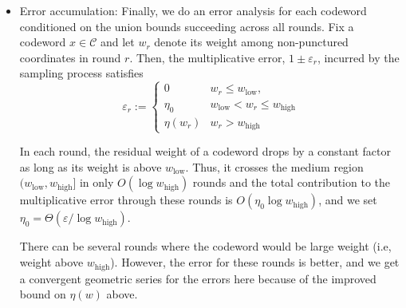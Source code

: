 \documentclass{article}
\renewcommand{\epsilon}{\varepsilon}
\DeclareMathOperator{\high}{\mathrm{high}}
\DeclareMathOperator{\low}{\mathrm{low}}
\newcommand{\<}{\langle}
\renewcommand{\>}{\rangle}
\newcommand{\calF}{\mathcal{F}}
\newcommand{\ignore}[1]{{}}
\begin{document}
\begin{itemize}
\item Error accumulation: Finally, we do an error analysis for each codeword conditioned on the union bounds succeeding across all rounds. Fix a codeword $x \in \mathcal{C}$ and let $w_r$ denote its weight among non-punctured coordinates in round $r$. Then, the multiplicative error, $1 \pm \epsilon_r$, incurred by the sampling process satisfies
$$
\epsilon_r := \begin{cases} 0 & w_r \leq w_{\low},\\
\eta_0 & w_{\low} < w_r \leq w_{\high}\\
\eta(w_r) & w_r > w_{\high}
\end{cases}
$$

In each round, the residual weight of a codeword drops by a constant factor as long as its weight is above $w_{\mathrm{low}}$. Thus, it crosses the medium region $(w_{\mathrm{low}}, w_{\mathrm{high}}]$ in only $O(\log w_{\mathrm{high}})$ rounds and the total contribution to the multiplicative error through these rounds is
$O(\eta_0\log w_{\mathrm{high}})$, and we set $\eta_0=\Theta(\varepsilon/\log w_{\mathrm{high}})$.

There can be several rounds where the codeword would be large weight (i.e, weight above $w_{\mathrm{high}}$). However, the error for these rounds is better, and we get a convergent geometric series for the errors here because of the improved bound on $\eta(w)$ above. 

\ignore{
\item \textbf{Medium vs.\ large weights (the key stratification).}
For \emph{medium weights} $w\le w_{\high}$, we enforce small trace complexity via puncturing and then union-bound
over traces. For \emph{large weights} $w>w_{\high}$, we do \emph{no puncturing} and instead union-bound directly
over codewords using the extremal bound
$|\calF^{(r)}_{(w,2w]}|\le (C w/k)^k$, while allowing a larger per-round error
$\eta(w)=\Theta(\sqrt{(k\log(e w/k)+\log R)/w})$ so that the Chernoff exponent
$\eta(w)^2 w$ matches $\log |\calF^{(r)}_{(w,2w]}|+\log R$.

\item \textbf{Error accumulation (why we do not set $\eta_0=\varepsilon/R$).}
For a fixed codeword, the residual weight drops by a constant factor each round
($W_{r+1}\approx W_r/2$), so it crosses the medium region $(w_{\min},w_{\high}]$ in only
$O(\log w_{\high})$ rounds. Thus the total medium contribution to the multiplicative error is
$O(\eta_0\log w_{\high})$, and we set $\eta_0=\Theta(\varepsilon/\log w_{\high})$.
Large-weight rounds are even fewer and contribute a convergent geometric series.
Formally this is captured by the recursion $\xi_r=\eta_r+(1+\eta_r)\xi_{r+1}$,
which implies $1+\xi_0=\prod_r(1+\eta_r)\le \exp(\sum_r \eta_r)$.}
\end{itemize}
\end{document}
